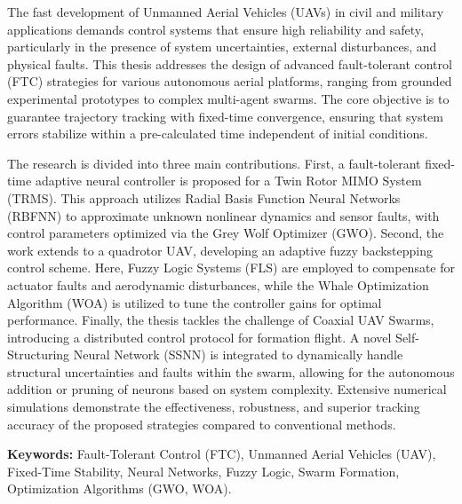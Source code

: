 % 
% 
%

The fast development of Unmanned Aerial Vehicles (UAVs) in civil and military applications demands control systems that ensure high reliability and safety, particularly in the presence of system uncertainties, external disturbances, and physical faults. This thesis addresses the design of advanced fault-tolerant control (FTC) strategies for various autonomous aerial platforms, ranging from grounded experimental prototypes to complex multi-agent swarms. The core objective is to guarantee trajectory tracking with fixed-time convergence, ensuring that system errors stabilize within a pre-calculated time independent of initial conditions.

The research is divided into three main contributions. First, a fault-tolerant fixed-time adaptive neural controller is proposed for a Twin Rotor MIMO System (TRMS). This approach utilizes Radial Basis Function Neural Networks (RBFNN) to approximate unknown nonlinear dynamics and sensor faults, with control parameters optimized via the Grey Wolf Optimizer (GWO). Second, the work extends to a quadrotor UAV, developing an adaptive fuzzy backstepping control scheme. Here, Fuzzy Logic Systems (FLS) are employed to compensate for actuator faults and aerodynamic disturbances, while the Whale Optimization Algorithm (WOA) is utilized to tune the controller gains for optimal performance. Finally, the thesis tackles the challenge of Coaxial UAV Swarms, introducing a distributed control protocol for formation flight. A novel Self-Structuring Neural Network (SSNN) is integrated to dynamically handle structural uncertainties and faults within the swarm, allowing for the autonomous addition or pruning of neurons based on system complexity. Extensive numerical simulations demonstrate the effectiveness, robustness, and superior tracking accuracy of the proposed strategies compared to conventional methods.


\textbf{Keywords:} 
Fault-Tolerant Control (FTC), Unmanned Aerial Vehicles (UAV), Fixed-Time Stability, Neural Networks, Fuzzy Logic, Swarm Formation, Optimization Algorithms (GWO, WOA).




